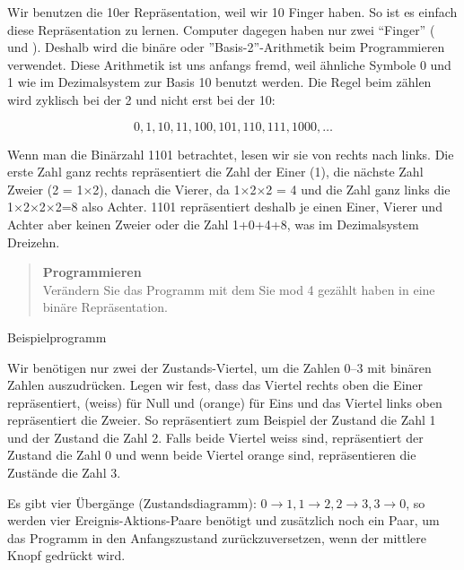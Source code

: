 Wir benutzen die 10er Repräsentation, weil wir 10 Finger haben. So ist es einfach diese Repräsentation zu lernen. Computer dagegen haben nur zwei ``Finger'' ( und ).
Deshalb wird die binäre oder ''Basis-2''-Arithmetik beim Programmieren verwendet. Diese Arithmetik ist uns anfangs fremd, weil ähnliche Symbole 0 und 1 wie im Dezimalsystem zur Basis 10 benutzt werden. Die Regel beim zählen wird zyklisch bei der 2 und nicht erst bei der 10:

\begin{displaymath}
0, 1, 10, 11, 100, 101, 110, 111, 1000, \ldots
\end{displaymath}

Wenn man die Binärzahl 1101 betrachtet, lesen wir sie von rechts nach links. Die erste Zahl ganz rechts repräsentiert die Zahl der Einer (1), die nächste Zahl Zweier (2 = 1$\times$2), danach die Vierer, da 1$\times$2$\times$2 = 4 und die Zahl ganz links die 1$\times$2$\times$2$\times$2=8 also Achter. 
1101 repräsentiert deshalb je einen Einer, Vierer und Achter aber keinen Zweier oder die Zahl 1+0+4+8, was im Dezimalsystem Dreizehn.

\begin{quote}
\textbf{Programmieren}\\
Verändern Sie das Programm mit dem Sie mod 4 gezählt haben in eine binäre Repräsentation.
\end{quote}

{\raggedleft \hfill Beispielprogramm }

Wir benötigen nur zwei der Zustands-Viertel, um die Zahlen 0--3 mit binären Zahlen auszudrücken. Legen wir fest, dass das Viertel rechts oben die Einer repräsentiert,  (weiss) für Null und  (orange) für Eins und das Viertel links oben repräsentiert die Zweier. So repräsentiert zum Beispiel der Zustand  die Zahl 1 und der Zustand  die Zahl 2.
Falls beide Viertel weiss sind, repräsentiert der Zustand die Zahl 0 und wenn beide Viertel orange sind, repräsentieren die Zustände die Zahl 3.

Es gibt vier Übergänge (Zustandsdiagramm): $0\rightarrow 1, 1\rightarrow 2, 2
\rightarrow 3, 3\rightarrow 0$, so werden vier Ereignis-Aktions-Paare benötigt und zusätzlich noch ein Paar, um das Programm in den Anfangszustand zurückzuversetzen, wenn der mittlere Knopf gedrückt wird.

\bigskip



